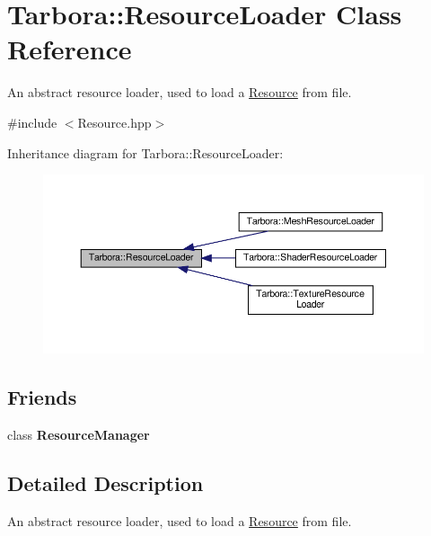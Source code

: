 \hypertarget{classTarbora_1_1ResourceLoader}{}\section{Tarbora\+:\+:Resource\+Loader Class Reference}
\label{classTarbora_1_1ResourceLoader}


An abstract resource loader, used to load a \hyperlink{classTarbora_1_1Resource}{Resource} from file.  




{\ttfamily \#include $<$Resource.\+hpp$>$}



Inheritance diagram for Tarbora\+:\+:Resource\+Loader\+:\nopagebreak
\begin{figure}[H]
\begin{center}
\leavevmode
\includegraphics[width=350pt]{classTarbora_1_1ResourceLoader__inherit__graph}
\end{center}
\end{figure}
\subsection*{Friends}
\begin{DoxyCompactItemize}
\item 
\mbox{\label{classTarbora_1_1ResourceLoader_a54c1252abc87a78a301e6b6984470408}} 
class {\bfseries Resource\+Manager}
\end{DoxyCompactItemize}


\subsection{Detailed Description}
An abstract resource loader, used to load a \hyperlink{classTarbora_1_1Resource}{Resource} from file. 


